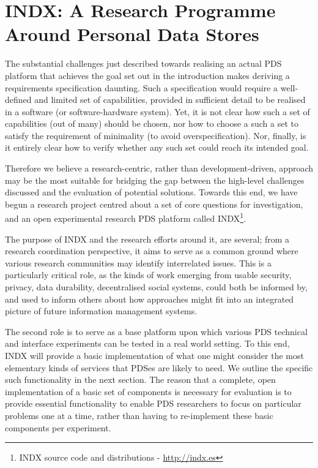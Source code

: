 \documentclass[graybox]{svmult}
\begin{document}
\section{INDX: A Research Programme Around Personal Data Stores}

The substantial challenges just described towards realising an actual PDS platform that achieves the goal set out in the introduction makes deriving a requirements specification daunting.  Such a specification would require a well-defined and limited set of capabilities, provided in sufficient detail to be realised in a software (or software-hardware system).  Yet, it is not clear how such a set of capabilities (out of many) should be chosen, nor how to choose a such a set to satisfy the requirement of minimality (to avoid overspecification).  Nor, finally, is it entirely clear how to verify whether any such set could reach its intended goal.

Therefore we believe a research-centric, rather than development-driven, approach may be the most suitable for bridging the gap between the high-level challenges discussed and the evaluation of potential solutions.  Towards this end, we have begun a research project centred about a set of core questions for investigation, and an open experimental research PDS platform called INDX\footnote{ INDX source code and distributions - \url{http://indx.es} }.

The purpose of INDX and the research efforts around it, are several; from a research coordination perspective, it aims to serve as a common ground where various research communities may identify interrelated issues.  This is a particularly critical role, as the kinds of work emerging from usable security, privacy, data durability, decentralised social systems, could both be informed by, and used to inform others about how approaches might fit into an integrated picture of future information management systems.

The second role is to serve as a base platform upon which various PDS technical and interface experiments can be tested in a real world setting.  To this end, INDX will provide a basic implementation of what one might consider the most elementary kinds of services that PDSes are likely to need.  We outline the specific such functionality in the next section.  The reason that a complete, open implementation of a basic set of components is necessary for evaluation is to provide essential functionality to enable PDS researchers to focus on particular problems one at a time, rather than having to re-implement these basic components per experiment.  
\end{document}
